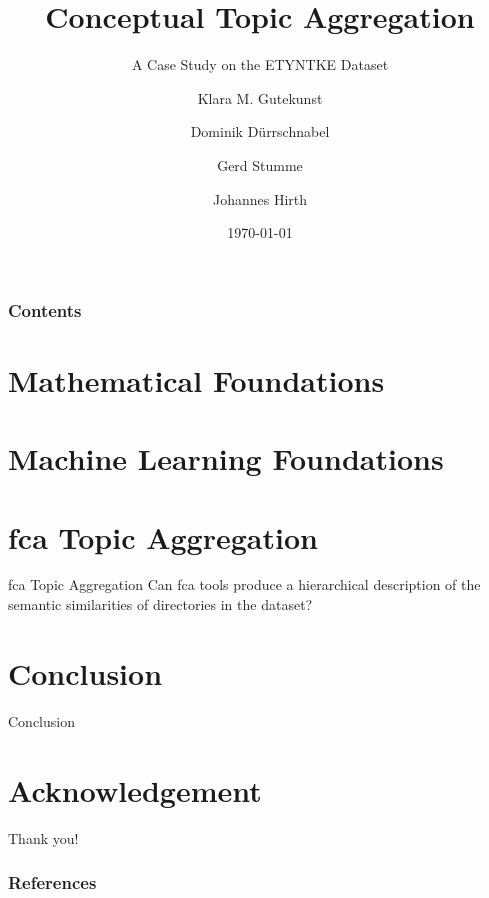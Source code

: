\documentclass[10pt]{beamer}
\title[\university{}]{Conceptual Topic Aggregation}
\subtitle{A Case Study on the ETYNTKE Dataset}
\author[Klara M. Gutekunst]{Klara M. Gutekunst \and Dominik Dürrschnabel \and Gerd Stumme \and Johannes Hirth}
\institute[klara.gutekunst@uni-kassel.de]{\university{}}
\date[\today]
{\today}
\begin{document}

\frame{\titlepage}
\begin{frame}
\frametitle{Contents}
\tableofcontents
\end{frame}



\section{Mathematical Foundations}



\section{Machine Learning Foundations}





\section{\acs{fca} Topic Aggregation}
    \begin{frame}{\acs{fca} Topic Aggregation}
    Can \acs{fca} tools produce a hierarchical description of the semantic similarities of directories in the dataset?
    \end{frame}



\section{Conclusion}
    \begin{frame}{Conclusion}
    \end{frame}



\section*{Acknowledgement}  
\begin{frame}
\textcolor{myNewColorA}{\Huge{\centerline{Thank you!}}}
\end{frame}


\begin{frame}[allowframebreaks]
\frametitle{References}
\printbibliography
\end{frame}


\end{document}
